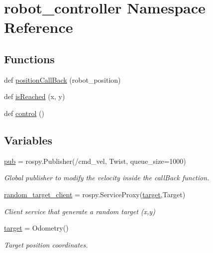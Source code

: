 \hypertarget{namespacerobot__controller}{}\section{robot\+\_\+controller Namespace Reference}
\label{namespacerobot__controller}
\subsection*{Functions}
\begin{DoxyCompactItemize}
\item 
def \hyperlink{namespacerobot__controller_a869c3c711979050c7e3fe9b61908ae4d}{position\+Call\+Back} (robot\+\_\+position)
\item 
def \hyperlink{namespacerobot__controller_ab3492a28557eb54f5f454111ff7d0495}{is\+Reached} (x, y)
\item 
def \hyperlink{namespacerobot__controller_a511c31df6f9bf112ed99fb8e649db6ae}{control} ()
\end{DoxyCompactItemize}
\subsection*{Variables}
\begin{DoxyCompactItemize}
\item 
\hyperlink{namespacerobot__controller_a122e6e82d013c9e474d7b5c987efde3d}{pub} = rospy.\+Publisher(\textquotesingle{}/cmd\+\_\+vel\textquotesingle{}, Twist, queue\+\_\+size=1000)
\begin{DoxyCompactList}\small\item\em Global publisher to modify the velocity inside the call\+Back function. \end{DoxyCompactList}\item 
\hyperlink{namespacerobot__controller_a7d2c9b24ddf4d6fc069f7bae05ba8935}{random\+\_\+target\+\_\+client} = rospy.\+Service\+Proxy(\textquotesingle{}\hyperlink{namespacerobot__controller_af6e678d9713033f52d7fb793cc429b98}{target}\textquotesingle{},Target)
\begin{DoxyCompactList}\small\item\em Client service that generate a random target (x,y) \end{DoxyCompactList}\item 
\hyperlink{namespacerobot__controller_af6e678d9713033f52d7fb793cc429b98}{target} = Odometry()
\begin{DoxyCompactList}\small\item\em Target position coordinates. \end{DoxyCompactList}\end{DoxyCompactItemize}


